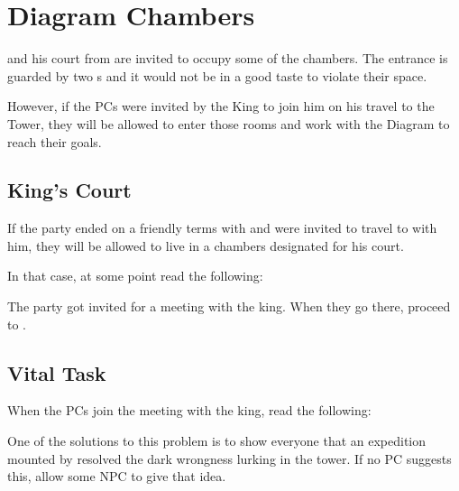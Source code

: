 \section{Diagram Chambers}
\label{sec:diagramChambers}

\npcTaravangian{} and his court from \locationKharbranth{} are invited to occupy some of the \locationUrithiru{} chambers. The entrance is guarded by two \enemyDiagramMuscle{}s and it would not be in a good taste to violate their space.

However, if the PCs were invited by the King to join him on his travel to the Tower, they will be allowed to enter those rooms and work with the Diagram to reach their goals.




\subsection{King's Court}

If the party ended  on a friendly terms with \npcTaravangian{} and were invited to travel to \locationUrithiru{} with him, they will be allowed to live in a chambers designated for his court.

In that case, at some point read the following:


The party got invited for a meeting with the king. When they go there, proceed to .

\subsection{Vital Task}
\label{ssec:diagramChambersQuest}

When the PCs join the meeting with the king, read the following:


One of the solutions to this problem is to show everyone that an expedition mounted by \npcTaravangian{} resolved the dark wrongness lurking in the tower. If no PC suggests this, allow some NPC to give that idea.

